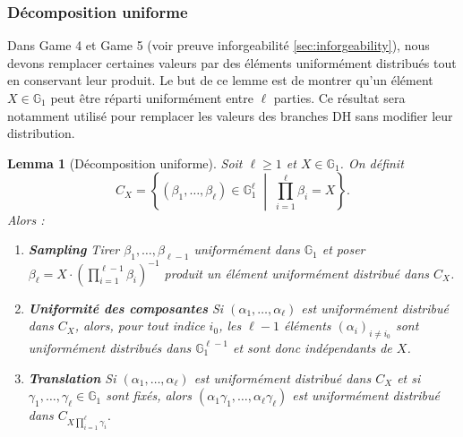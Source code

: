 \documentclass[10pt,a4paper]{article}
\theoremstyle{definition}
\theoremstyle{plain}
\newtheorem{lemma}[definition]{Lemma}
\theoremstyle{remark}
\begin{document}
\subsubsection{Décomposition uniforme}

Dans Game 4 et Game 5 (voir preuve inforgeabilité \ref{sec:inforgeability}), nous devons remplacer certaines valeurs par des
éléments uniformément distribués tout en conservant leur produit.
Le but de ce lemme est de montrer qu'un élément $X\in\mathbb{G}_1$
peut être réparti uniformément entre $\ell$ parties.
Ce résultat sera notamment utilisé pour remplacer les valeurs des branches DH
sans modifier leur distribution.

\begin{lemma}[Décomposition uniforme]
\label{lem:sharing}
Soit $\ell \geq 1$ et $X \in \mathbb{G}_1$. On définit
\[
C_X =
\left\{
(\beta_1,\ldots,\beta_\ell)\in\mathbb{G}_1^\ell
\;\middle|\;
\prod_{i=1}^{\ell}\beta_i=X
\right\}.
\]
Alors :
\begin{enumerate}
    \item[\textnormal{(i)}] \textbf{Sampling}
    Tirer $\beta_1,\ldots,\beta_{\ell-1}$ uniformément dans $\mathbb{G}_1$
    et poser
    $
    \beta_\ell
    =
    X\cdot
    \left(\prod_{i=1}^{\ell-1}\beta_i\right)^{-1}
    $
    produit un élément uniformément distribué dans $C_X$.

    \item[\textnormal{(ii)}] \textbf{Uniformité des composantes}
    Si
    $(\alpha_1,\ldots,\alpha_\ell)$ est uniformément distribué dans
    $C_X$, alors, pour tout indice $i_0$,
    les $\ell-1$ éléments $(\alpha_i)_{i\neq i_0}$
    sont uniformément distribués dans
    $\mathbb{G}_1^{\ell-1}$ et sont donc indépendants de $X$.

    \item[\textnormal{(iii)}] \textbf{Translation}
    Si
    $(\alpha_1,\ldots,\alpha_\ell)$ est uniformément distribué dans
    $C_X$ et si
    $\gamma_1,\ldots,\gamma_\ell\in\mathbb{G}_1$ sont fixés, alors
    $
    (\alpha_1\gamma_1,\ldots,\alpha_\ell\gamma_\ell)
    $
    est uniformément distribué dans
    $
    C_{X\prod_{i=1}^{\ell}\gamma_i}.
    $
\end{enumerate}

\end{lemma}
\end{document}

